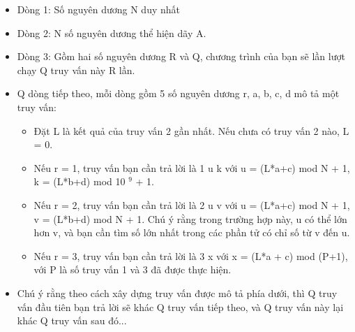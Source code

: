 \begin{itemize}
	\item Dòng 1: Số nguyên dương N duy nhất
	\item Dòng 2: N số nguyên dương thể hiện dãy A.
	\item Dòng 3: Gồm hai số nguyên dương R và Q, chương trình của bạn sẽ lần lượt chạy Q truy vấn này R lần.
	\item Q dòng tiếp theo, mỗi dòng gồm 5 số nguyên dương r, a, b, c, d mô tả một truy vấn:
\begin{itemize}
	\item Đặt L là kết quả của truy vấn 2 gần nhất. Nếu chưa có truy vấn 2 nào, L = 0.
	\item Nếu r = 1, truy vấn bạn cần trả lời là 1 u k với u = (L*a+c) mod N + 1, k = (L*b+d) mod 10 $^ 9 $ + 1.
	\item Nếu r = 2, truy vấn bạn cần trả lời là 2 u v với u = (L*a+c) mod N + 1, v = (L*b+d) mod N + 1. Chú ý rằng trong trường hợp này, u có thể lớn hơn v, và bạn cần tìm số lớn nhất trong các phần tử có chỉ số từ v đến u.
	\item Nếu r = 3, truy vấn bạn cần trả lời là 3 x với x = (L*a + c) mod (P+1), với P là số truy vấn 1 và 3 đã được thực hiện.
\end{itemize}
	\item Chú ý rằng theo cách xây dựng truy vấn được mô tả phía dưới, thì Q truy vấn đầu tiên bạn trả lời sẽ khác Q truy vấn tiếp theo, và Q truy vấn này lại khác Q truy vấn sau đó...
\begin{itemize}
\end{itemize}
\end{itemize}